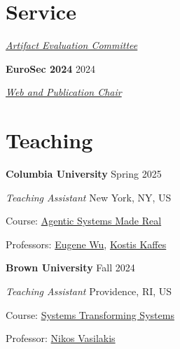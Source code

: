 \documentclass[margin,12pt]{resume}
\newcommand{\subsectionVSpace}{\vspace{3.5ex}\xspace}
\newcommand{\sectionVSpace}{\vspace{1ex}\xspace} %
\newcommand{\sectionVSpaceCorrection}{\vspace{-3.5ex}} %
\newcommand{\header}[1]{\textbf{#1}\xspace}
\newcommand{\institution}[1]{\header{#1}\xspace}
\newcommand{\place}[1]{#1\xspace}
\newcommand{\role}[1]{\textit{#1}\xspace}
\newcommand{\service}[1]{\header{#1}\xspace}
\newcommand{\singleDate}[1]{#1\xspace}
\newcommand{\stitle}[1]{#1:\xspace}
\newenvironment{rSubsection}{}{\par\subsectionVSpace}
\newenvironment{rSection}[1]{\sectionVSpaceCorrection\section{#1}\xspace}{\sectionVSpace\par}
\begin{document}
\begin{resume}
\begin{rSection}{Service}
\begin{rSubsection}
            \role{\href{https://www.usenix.org/conference/osdi25}{Artifact Evaluation Committee}}
        \end{rSubsection}

        \begin{rSubsection}
            \service{EuroSec 2024} \hfill 2024

            \role{\href{https://secopera.eu/eurosec-2024/}{Web and Publication Chair}}
        \end{rSubsection}
    \end{rSection}

    \begin{rSection}{Teaching}




        \begin{rSubsection}
            \institution{Columbia University} \hfill \singleDate{Spring 2025}

            \role{Teaching Assistant} \hfill \place{New York, NY, US}

            \stitle{Course} \href{https://w6113.github.io/}{Agentic Systems Made Real}

            \stitle{Professors} \href{https://www.cs.columbia.edu/~ewu/}{Eugene Wu}, \href{https://www.cs.columbia.edu/~kkaffes/index.html}{Kostis Kaffes}
        \end{rSubsection}

        \begin{rSubsection}
            \institution{Brown University} \hfill \singleDate{Fall 2024}

            \role{Teaching Assistant} \hfill \place{Providence, RI, US}

            \stitle{Course} \href{https://cs.brown.edu/courses/csci2952r/}{Systems Transforming Systems}

            \stitle{Professor} \href{https://nikos.vasilak.is}{Nikos Vasilakis}


\end{rSubsection}
\end{rSection}
\end{resume}
\end{document}
